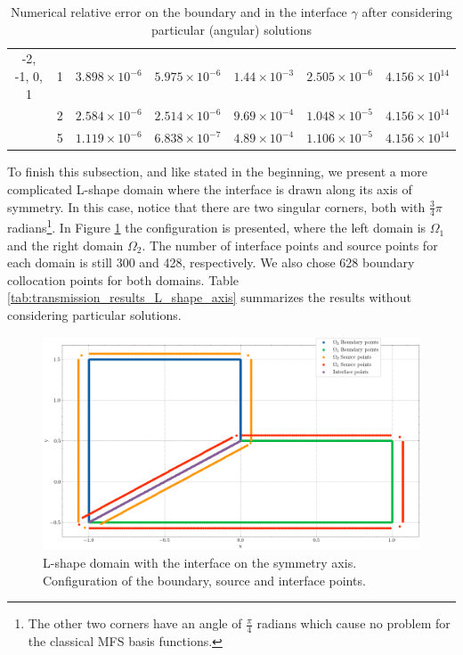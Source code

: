 \begin{table}[htbp]
\begin{longtable}{ccccccc}
        -2, -1, 0, 1 & 1 & $3.898\times10^{-6}$ & $5.975\times10^{-6}$ & $1.44\times10^{-3}$ & $2.505\times10^{-6}$ & $4.156\times10^{14}$ \\
        & 2 & $2.584\times10^{-6}$ & $2.514\times10^{-6}$ & $9.69\times10^{-4}$ & $1.048\times10^{-5}$ & $4.156\times10^{14}$ \\
        & 5 & $1.119\times10^{-6}$ & $6.838\times10^{-7}$ & $4.89\times10^{-4}$ & $1.106\times10^{-5}$ & $4.156\times10^{14}$ \\
        \midrule[\heavyrulewidth] %
    \end{longtable}
    \caption{Numerical relative error on the boundary and in the interface \(\gamma\) after considering particular (angular) solutions}
    \label{tab:transmission_results_L_shape_rectangles_particular}
\end{table}

To finish this subsection, and like stated in the beginning, we present a more complicated L-shape domain where the interface is drawn along its axis of symmetry. In this case, notice that there are two singular corners, both with \(\frac{3}{4}\pi\) radians\footnote{The other two corners have an angle of \(\frac{\pi}{4}\) radians which cause no problem for the classical MFS basis functions.}. In Figure \ref{transmission_L_shape_col_axis_config} the configuration is presented, where the left domain is \(\Omega_1\) and the right domain \(\Omega_2\). The number of interface points and source points for each domain is still 300 and 428, respectively. We also chose 628 boundary collocation points for both domains. Table \ref{tab:transmission_results_L_shape_axis} summarizes the results without considering particular solutions.

\begin{figure}[!htb]
    \centering
    \includegraphics[height=0.4\linewidth,width=0.53\linewidth]{Images/Transmission/L_shape_2_axis_col_points.png}
    \caption{L-shape domain with the interface on the symmetry axis. Configuration of the boundary, source and interface points.}
    \label{transmission_L_shape_col_axis_config}
\end{figure}

